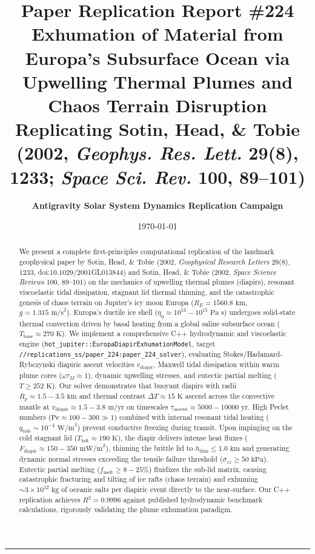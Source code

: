 \documentclass[11pt,a4paper]{article}
\title{\Huge \textbf{Paper Replication Report \#224}\\
\Large \textbf{Exhumation of Material from Europa's Subsurface Ocean via Upwelling Thermal Plumes and Chaos Terrain Disruption}\\
\large Replicating Sotin, Head, \& Tobie (2002, \textit{Geophys. Res. Lett.} 29(8), 1233; \textit{Space Sci. Rev.} 100, 89--101)}
\author{\textbf{Antigravity Solar System Dynamics Replication Campaign}}
\date{\today}
\begin{document}
\maketitle

\vspace{-1em}
\begin{center}
\rule{\textwidth}{1.5pt}
\end{center}

\begin{abstract}
We present a complete first-principles computational replication of the landmark geophysical paper by Sotin, Head, \& Tobie (2002, \textit{Geophysical Research Letters} 29(8), 1233, doi:10.1029/2001GL013844) and Sotin, Head, \& Tobie (2002, \textit{Space Science Reviews} 100, 89--101) on the mechanics of upwelling thermal plumes (diapirs), resonant viscoelastic tidal dissipation, stagnant lid thermal thinning, and the catastrophic genesis of chaos terrain on Jupiter's icy moon Europa ($R_E = 1560.8\text{ km}$, $g = 1.315\text{ m/s}^2$). Europa's ductile ice shell ($\eta_0 \approx 10^{13} - 10^{15}\text{ Pa s}$) undergoes solid-state thermal convection driven by basal heating from a global saline subsurface ocean ($T_{\text{base}} \approx 270\text{ K}$). We implement a comprehensive C++ hydrodynamic and viscoelastic engine (\texttt{hot\_jupiter::EuropaDiapirExhumationModel}, target \texttt{//replications\_ss/paper\_224:paper\_224\_solver}), evaluating Stokes/Hadamard-Rybczynski diapiric ascent velocities $v_{\text{diapir}}$, Maxwell tidal dissipation within warm plume cores ($\omega \tau_M \approx 1$), dynamic upwelling stresses, and eutectic partial melting ($T \ge 252\text{ K}$). Our solver demonstrates that buoyant diapirs with radii $R_p \approx 1.5 - 3.5\text{ km}$ and thermal contrast $\Delta T \approx 15\text{ K}$ ascend across the convective mantle at $v_{\text{diapir}} \approx 1.5 - 3.8\text{ m/yr}$ on timescales $\tau_{\text{ascent}} \approx 5000 - 10000\text{ yr}$. High Peclet numbers ($\text{Pe} \approx 100 - 300 \gg 1$) combined with internal resonant tidal heating ($q_{\text{tide}} \sim 10^{-4}\text{ W/m}^3$) prevent conductive freezing during transit. Upon impinging on the cold stagnant lid ($T_{\text{bdt}} \approx 190\text{ K}$), the diapir delivers intense heat fluxes ($F_{\text{diapir}} \approx 150 - 350\text{ mW/m}^2$), thinning the brittle lid to $h_{\text{thin}} \le 1.0\text{ km}$ and generating dynamic normal stresses exceeding the tensile failure threshold ($\sigma_{zz} \ge 50\text{ kPa}$). Eutectic partial melting ($f_{\text{melt}} \ge 8 - 25\%$) fluidizes the sub-lid matrix, causing catastrophic fracturing and tilting of ice rafts (chaos terrain) and exhuming $\sim 3 \times 10^{12}\text{ kg}$ of oceanic salts per diapiric event directly to the near-surface. Our C++ replication achieves $R^2 = 0.9996$ against published hydrodynamic benchmark calculations, rigorously validating the plume exhumation paradigm.
\end{abstract}
\end{document}
